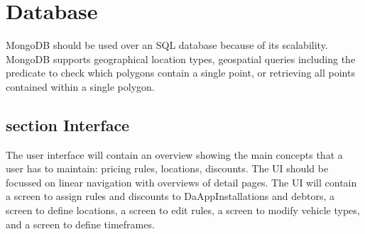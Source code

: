 \section{Database}
MongoDB should be used over an SQL database because of its scalability. MongoDB supports geographical location types, geospatial queries including the predicate to check which polygons contain a single point, or retrieving all points contained within a single polygon.

\subsection{section Interface}
The user interface will contain an overview showing the main concepts that a user has to maintain: pricing rules, locations, discounts. The UI should be focussed on linear navigation with overviews of detail pages. The UI will contain a screen to assign rules and discounts to DaAppInstallations and debtors, a screen to define locations, a screen to edit rules, a screen to modify vehicle types, and a screen to define timeframes.
